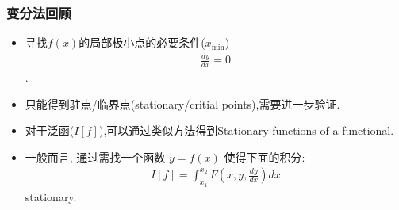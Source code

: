 \documentclass[UTF8, aspectratio=169, 9pt]{ctexbeamer}
\begin{document}
\begin{frame}
  \frametitle{变分法回顾}
  \begin{itemize}
  \item 寻找$f(x)$的局部极小点的必要条件($x_{\min}$)
    \begin{align}
      \frac{dy}{dx} = 0
    \end{align}.
  \item 只能得到驻点/临界点(stationary/critial points),需要进一步验证.
  \item 对于泛函($I[f]$),可以通过类似方法得到Stationary functions of a functional.
  \item 一般而言, 通过需找一个函数 $y=f(x)$ 使得下面的积分:
    \begin{align}
      I[f] = \int_{x_1}^{x_2} F( x, y, \frac{dy}{dx} ) dx
    \end{align}
    stationary.
  \end{itemize}
\end{frame}
\end{document}
